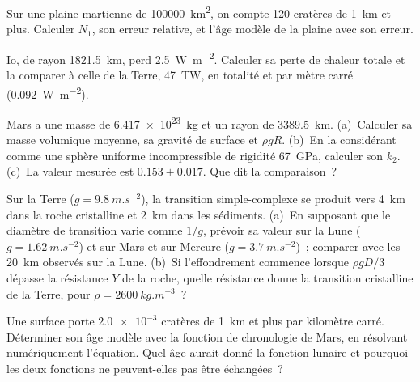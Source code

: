 \begin{exercise}[$\star$]\label{exo:b3:planetary-interiors-surfaces:3}
Sur une plaine martienne de \qty{100000}{km^2}, on compte 120 cratères de \qty{1}{km} et
plus. Calculer $N_1$, son erreur relative, et l'âge modèle de la plaine
avec son erreur.
\end{exercise}

\begin{exercise}[$\star$]\label{exo:b3:planetary-interiors-surfaces:4}
Io, de rayon \qty{1821.5}{km}, perd \qty{2.5}{W.m^{-2}}. Calculer sa perte
de chaleur totale et la comparer à celle de la Terre, \qty{47}{TW}, en totalité et
par mètre carré (\qty{0.092}{W.m^{-2}}).
\end{exercise}

\begin{exercise}[$\star\star$]\label{exo:b3:planetary-interiors-surfaces:5}
Mars a une masse de \qty{6.417e23}{kg} et un rayon de \qty{3389.5}{km}.
(a)~Calculer sa masse volumique moyenne, sa gravité de surface et $\rho gR$.
(b)~En la considérant comme une sphère uniforme incompressible de rigidité
\qty{67}{GPa}, calculer son  $k_2$. (c)~La valeur mesurée est
$0.153 \pm 0.017$. Que dit la comparaison~?
\end{exercise}

\begin{exercise}[$\star\star$]\label{exo:b3:planetary-interiors-surfaces:6}
Sur la Terre ($g = \qty{9.8}{m.s^{-2}}$), la transition simple-complexe
se produit vers \qty{4}{km} dans la roche cristalline et \qty{2}{km} dans
les sédiments. (a)~En supposant que le diamètre de transition varie comme $1/g$,
prévoir sa valeur sur la Lune ($g = \qty{1.62}{m.s^{-2}}$) et sur Mars et
sur Mercure ($g = \qty{3.7}{m.s^{-2}}$)~; comparer avec les \qty{20}{km}
observés sur la Lune. (b)~Si l'effondrement commence lorsque $\rho gD/3$ dépasse la
résistance $Y$ de la roche, quelle résistance donne la transition cristalline de la Terre,
pour $\rho = \qty{2600}{kg.m^{-3}}$~?
\end{exercise}

\begin{exercise}[$\star\star$]\label{exo:b3:planetary-interiors-surfaces:7}
Une surface porte $\num{2.0e-3}$ cratères de \qty{1}{km} et plus par
kilomètre carré. Déterminer son âge modèle avec la fonction de chronologie de Mars,
en résolvant numériquement l'équation. Quel âge aurait donné la fonction lunaire
et pourquoi les deux fonctions ne peuvent-elles pas être échangées~?
\end{exercise}

